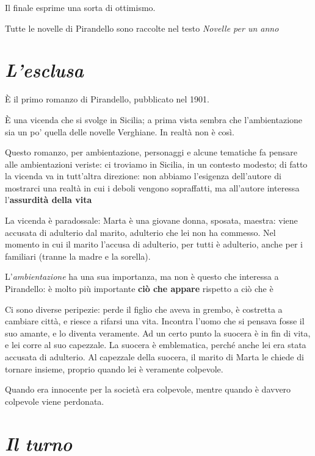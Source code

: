 Il finale esprime una sorta di ottimismo.

Tutte le novelle di Pirandello sono raccolte nel testo \textit{Novelle per un anno}

\chapter{\textit{L'esclusa}}

È il primo romanzo di Pirandello, pubblicato nel 1901.

È una vicenda che si svolge in Sicilia; a prima vista sembra che l'ambientazione sia un po' quella delle novelle Verghiane. In realtà non è così.

Questo romanzo, per ambientazione, personaggi e alcune tematiche fa pensare alle ambientazioni veriste: ci troviamo in Sicilia, in un contesto modesto; di fatto la vicenda va in tutt'altra direzione: non abbiamo l'esigenza dell'autore di mostrarci una realtà in cui i deboli vengono sopraffatti, ma all'autore interessa l'\textbf{assurdità della vita}

La vicenda è paradossale: Marta è una giovane donna, sposata, maestra: viene accusata di adulterio dal marito, adulterio che lei non ha commesso. Nel momento in cui il marito l'accusa di adulterio, per tutti è adulterio, anche per i familiari (tranne la madre e la sorella).

L'\emph{ambientazione} ha una sua importanza, ma non è questo che interessa a Pirandello: è molto più importante \textbf{ciò che appare} rispetto a ciò che è

Ci sono diverse peripezie: perde il figlio che aveva in grembo, è costretta a cambiare città, e riesce a rifarsi una vita.
Incontra l'uomo che si pensava fosse il suo amante, e lo diventa veramente.
Ad un certo punto la suocera è in fin di vita, e lei corre al suo capezzale. La suocera è emblematica, perché anche lei era stata accusata di adulterio.
Al capezzale della suocera, il marito di Marta le chiede di tornare insieme, proprio quando lei è veramente colpevole.

Quando era innocente per la società era colpevole, mentre quando è davvero colpevole viene perdonata.

\chapter{\textit{Il turno}}

